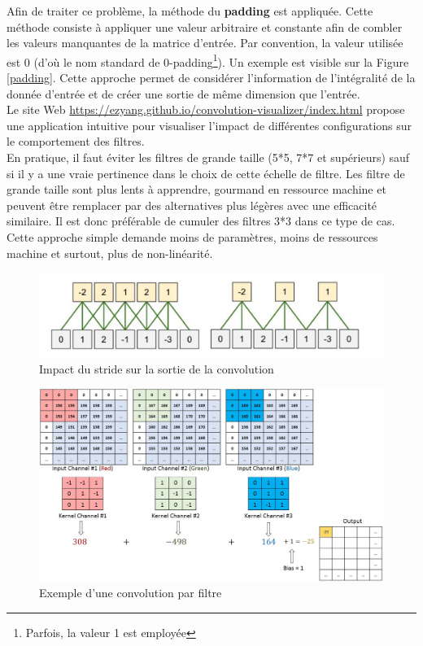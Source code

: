 \noindent Afin de traiter ce problème, la méthode du \textbf{padding} est appliquée. Cette méthode consiste à appliquer une valeur arbitraire et constante afin de combler les valeurs manquantes de la matrice d'entrée. Par convention, la valeur utilisée est 0 (d'où le nom standard de 0-padding\footnote{Parfois, la valeur 1 est employée}). Un exemple est visible sur la Figure \ref{padding}. Cette approche permet de considérer l'information de l'intégralité de la donnée d'entrée et de créer une sortie de même dimension que l'entrée.\\

\noindent Le site Web \url{https://ezyang.github.io/convolution-visualizer/index.html} propose une application intuitive pour visualiser l'impact de différentes configurations sur le comportement des filtres.\\

\noindent En pratique, il faut éviter les filtres de grande taille (5*5, 7*7 et supérieurs) sauf si il y a une vraie pertinence dans le choix de cette échelle de filtre. Les filtre de grande taille sont plus lents à apprendre, gourmand en ressource machine et peuvent être remplacer par des alternatives plus légères avec une efficacité similaire. Il est donc préférable de cumuler des filtres 3*3 dans ce type de cas. Cette approche simple demande moins de paramètres, moins de ressources machine et surtout, plus de non-linéarité.

\begin{figure}
    \centering
    \includegraphics[scale=0.4]{./tex/convolution-network/cnn/stride.png}
    \caption{Impact du stride sur la sortie de la convolution}
    \label{stride_fig}
\end{figure}

\begin{figure}
    \centering
    \includegraphics[scale=0.3]{./tex/convolution-network/cnn/conv_filtre.png}
    \caption{Exemple d'une convolution par filtre}
    \label{conv_fil}
\end{figure}

